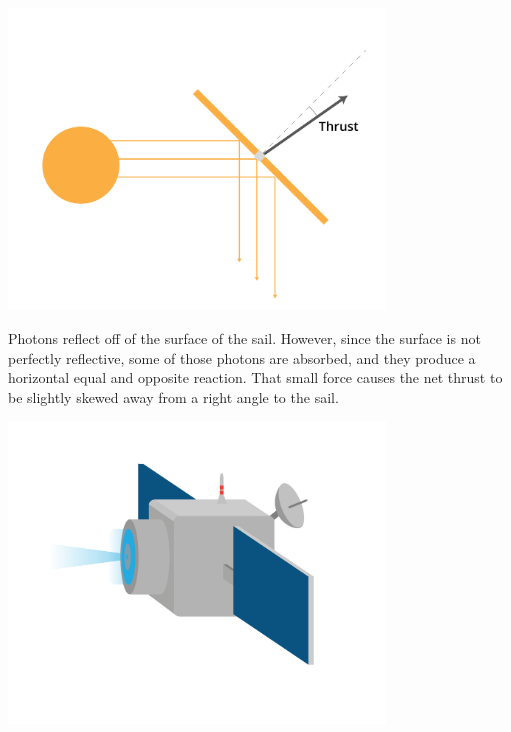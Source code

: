 \includegraphics[width=0.75\textwidth]{solarSailDiagram.png}

Photons reflect off of the surface of the sail. However, since the surface is not perfectly reflective, some of those photons are absorbed, and they produce a horizontal equal and opposite reaction. That small force causes the net thrust to be slightly skewed away from a right angle to the sail.


\includegraphics[width=0.75\textwidth]{ionThruster.png}





